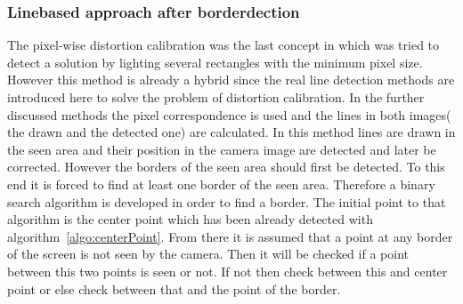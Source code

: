 \documentclass[journal,final,a4paper,twoside]{PS}
\begin{document}
\subsubsection{Linebased approach after borderdection}
The pixel-wise distortion calibration was the last concept in which was tried to detect a solution by lighting several rectangles with the minimum pixel size. However this method is already a hybrid since the real line detection methods are introduced here to solve the problem of distortion calibration. In the further discussed methods the pixel correspondence is used and the lines in both images( the drawn and the detected one) are calculated. In this method lines are drawn in the seen area and their position in the camera image are detected and later be corrected. However the borders of the seen area should first be detected. To this end it is forced to find at least one border of the seen area. Therefore a binary search algorithm is developed in order to find a border. The initial point to that algorithm is the center point which has been already detected with algorithm~\ref{algo:centerPoint}. From there it is assumed that a point at any border of the screen is not seen by the camera. Then it will be checked if a point between this two points is seen or not. If not then check between this and center point or else check between that and the point of the border. %


\end{document}
